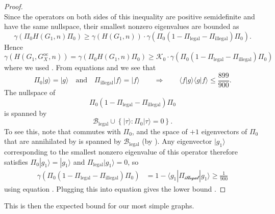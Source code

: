 \documentclass[../thesis-main/thesis-main]{subfiles}
\begin{document}
\begin{proof}
\begin{equation}
\end{equation}
Since the operators on both sides of this inequality are positive semidefinite and have the same nullspace, their smallest nonzero eigenvalues are bounded as 
\begin{equation}
\gamma(\Pi_{0}H(G_{1},n)\Pi_{0})\geq\gamma(H(G_{1},n))\cdot\gamma(\Pi_{0}(1-\Pi_{\text{legal}}-\Pi_{\text{illegal}})\Pi_{0}).
\end{equation}
Hence 
\begin{equation}
\gamma(H(G_{1},G_X^{\text{oc}},n))=\gamma(\Pi_{0}H(G_{1},n)\Pi_{0}) \geq \mathcal{K}_0\cdot\gamma(\Pi_{0}(1-\Pi_{\text{legal}}-\Pi_{\text{illegal}})\Pi_{0})
\label{eq:gamma_bnd1}
\end{equation}
where we used . From equations  and  we see that 
\begin{equation}
\Pi_{0}|g\rangle=|g\rangle\quad\text{and}\quad\Pi_{\text{illegal}}|f\rangle=|f\rangle\qquad\Longrightarrow\qquad\langle f|g\rangle\langle g|f\rangle\leq\frac{899}{900}.\label{eq:fg_eqn}
\end{equation}
The nullspace of 
\begin{equation}
\Pi_{0}\left(1-\Pi_{\text{legal}}-\Pi_{\text{illegal}}\right)\Pi_{0}\label{eq:projector_conjugated}
\end{equation}
is spanned by 
\begin{equation}
\mathcal{B}_{\text{legal}}\cup\left\{ |\tau\rangle\colon\Pi_{0}|\tau\rangle=0\right\} .
\end{equation}
To see this, note that  commutes with $\Pi_{0}$, and the space of $+1$ eigenvectors of $\Pi_{0}$ that are annihilated by  is spanned by $\mathcal{B}_{\text{legal}}$ (by ). Any eigenvector $|g_{1}\rangle$ corresponding to the smallest nonzero eigenvalue of this operator therefore satisfies $\Pi_{0}|g_{1}\rangle=|g_{1}\rangle$ and $\Pi_{\text{legal}}|g_{1}\rangle=0$, so 
\begin{align}
\gamma(\Pi_{0}(1-\Pi_{\text{legal}}-\Pi_{\text{illegal}})\Pi_{0}) 
&= 1-\langle g_{1}|\Pi_{\mathcal{\text{illegal}}}|g_{1}\rangle\geq\frac{1}{900}
\end{align}
using equation . Plugging this into equation  gives the lower bound . 
\end{proof}

This is then the expected bound for our most simple graphs.
\end{document}
